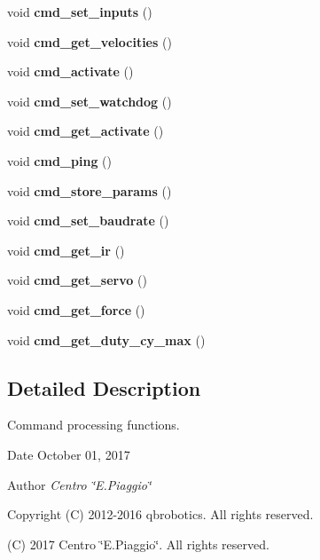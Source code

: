 \begin{DoxyCompactItemize}
\mbox{\label{command__processing_8h_a2d8a4542f55af960a27f875b00aad6a1}} 
void {\bfseries cmd\+\_\+set\+\_\+inputs} ()
\item 
\mbox{\label{command__processing_8h_a212883283bd7a8f32846615271cad8ce}} 
void {\bfseries cmd\+\_\+get\+\_\+velocities} ()
\item 
\mbox{\label{command__processing_8h_a107fc9f2982f9a953bdd82aa07279499}} 
void {\bfseries cmd\+\_\+activate} ()
\item 
\mbox{\label{command__processing_8h_aa94cd9c2e2fbfc5b98e84f67569cfe82}} 
void {\bfseries cmd\+\_\+set\+\_\+watchdog} ()
\item 
\mbox{\label{command__processing_8h_a554d563001517bfbc44400a1e999b393}} 
void {\bfseries cmd\+\_\+get\+\_\+activate} ()
\item 
\mbox{\label{command__processing_8h_a704f8c8cb0f4d75f243fc2b79bc34188}} 
void {\bfseries cmd\+\_\+ping} ()
\item 
\mbox{\label{command__processing_8h_a1a2493bfc2f30171d7e7a3bd5aebab14}} 
void {\bfseries cmd\+\_\+store\+\_\+params} ()
\item 
\mbox{\label{command__processing_8h_aa86bf1f2fa69ab5927f7e4e40eb40581}} 
void {\bfseries cmd\+\_\+set\+\_\+baudrate} ()
\item 
\mbox{\label{command__processing_8h_aa8deb0d217c870fb9523ac35b98303ac}} 
void {\bfseries cmd\+\_\+get\+\_\+ir} ()
\item 
\mbox{\label{command__processing_8h_a9fe051a55635782fd7f6caadcc13a2e8}} 
void {\bfseries cmd\+\_\+get\+\_\+servo} ()
\item 
\mbox{\label{command__processing_8h_a6c4d3e3210b0b6495ccac73a03e0cc38}} 
void {\bfseries cmd\+\_\+get\+\_\+force} ()
\item 
\mbox{\label{command__processing_8h_a43fb73e07e991a54dc51896da7795232}} 
void {\bfseries cmd\+\_\+get\+\_\+duty\+\_\+cy\+\_\+max} ()
\end{DoxyCompactItemize}


\subsection{Detailed Description}
Command processing functions. 

\begin{DoxyDate}{Date}
October 01, 2017 
\end{DoxyDate}
\begin{DoxyAuthor}{Author}
{\itshape Centro \char`\"{}\+E.\+Piaggio\char`\"{}} 
\end{DoxyAuthor}
\begin{DoxyCopyright}{Copyright}
(C) 2012-\/2016 qbrobotics. All rights reserved. 

(C) 2017 Centro \char`\"{}\+E.\+Piaggio\char`\"{}. All rights reserved. 
\end{DoxyCopyright}


